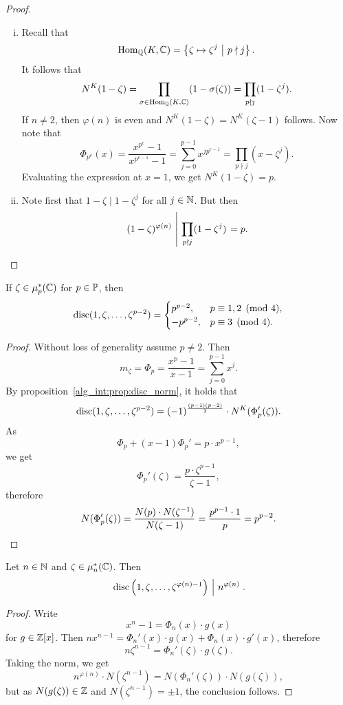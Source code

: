 \begin{proof}
\phantom{i}
\begin{enumerate}[i)]
\item Recall that
\[
\Hom_\Q(K, \C) =
\setb{\zeta \mapsto \zeta^j}{p \nmid j}.
\]
It follows that
\[
N^K(1-\zeta) =
\prod_{\sigma \in \Hom_\Q(K, \C)} (1 - \sigma(\zeta)) =
\prod_{p \nmid j} (1-\zeta^j).
\]
If $n \ne 2$, then $\varphi(n)$ is even and
$N^K(1-\zeta) = N^K(\zeta-1)$ follows. Now note that
\[
\Phi_{p^e}(x) =
\frac{x^{p^e}-1}{x^{p^{e-1}}-1} =
\sum_{j=0}^{p-1} x^{j p^{e-1}} =
\prod_{p \nmid j} (x - \zeta^j).
\]
Evaluating the expression at $x = 1$, we get $N^K(1-\zeta) = p$.
\item Note first that $1-\zeta \mid 1-\zeta^j$ for all $j \in \N$.
But then
\[
\left.(1-\zeta)^{\varphi(n)}~\middle\vert~
\prod_{p \nmid j} (1-\zeta^j)\right. =
p. \qedhere
\]
\end{enumerate}
\end{proof}

\begin{lema}
If $\zeta \in \mu_p^*(\C)$ for $p \in \P$, then
\[
\disc(1, \zeta, \dots, \zeta^{p-2}) =
\begin{cases}
 p^{p-2}, & p \equiv 1, 2 \pmod{4}, \\
-p^{p-2}, & p \equiv 3 \pmod{4}.
\end{cases}
\]
\end{lema}

\begin{proof}
Without loss of generality assume $p \ne 2$. Then
\[
m_\zeta = \Phi_p = \frac{x^p-1}{x-1} = \sum_{j=0}^{p-1} x^j.
\]
By proposition~\ref{alg_int:prop:disc_norm}, it holds that
\[
\disc(1, \zeta, \dots, \zeta^{p-2}) =
(-1)^{\frac{(p-1)(p-2)}{2}} \cdot N^K(\Phi_p'(\zeta)).
\]
As
\[
\Phi_p + (x-1) \Phi_p' = p \cdot x^{p-1},
\]
we get
\[
\Phi_p'(\zeta) =
\frac{p \cdot \zeta^{p-1}}{\zeta - 1},
\]
therefore
\[
N(\Phi_p'(\zeta)) =
\frac{N(p) \cdot N(\zeta^{-1})}{N(\zeta-1)} =
\frac{p^{p-1} \cdot 1}{p} =
p^{p-2}. \qedhere
\]
\end{proof}

\begin{lema}
Let $n \in \N$ and $\zeta \in \mu_n^*(\C)$. Then
\[
\left.\disc \br{1, \zeta, \dots, \zeta^{\varphi(n)-1}}
~\middle\vert~n^{\varphi(n)}\right..
\]
\end{lema}

\begin{proof}
Write
\[
x^n-1 = \Phi_n(x) \cdot g(x)
\]
for $g \in \Z[x]$. Then
$n x^{n-1} = \Phi_n'(x) \cdot g(x) + \Phi_n(x) \cdot g'(x)$,
therefore
\[
n \zeta^{n-1} = \Phi_n'(\zeta) \cdot g(\zeta).
\]
Taking the norm, we get
\[
n^{\varphi(n)} \cdot N(\zeta^{n-1}) =
N(\Phi_n'(\zeta)) \cdot  N(g(\zeta)),
\]
but as $N(g(\zeta)) \in \Z$ and $N(\zeta^{n-1}) = \pm 1$, the
conclusion follows.
\end{proof}

